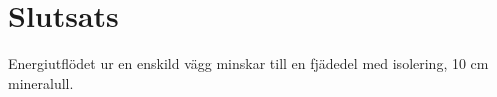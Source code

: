 \chapter{Slutsats}

Energiutflödet ur en enskild vägg minskar till en fjädedel med isolering, 10 cm mineralull.